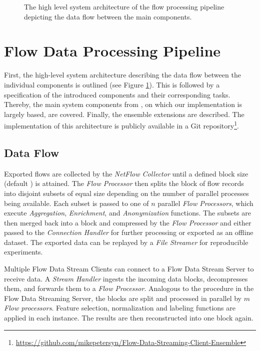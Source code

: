 \documentclass[conference]{IEEEtran}
\begin{document}
\begin{figure}[t]
\centering

\caption{The high level system architecture of the flow processing pipeline depicting the data flow between the main components.}
\label{fig:system_architecture}
\end{figure}

\newpage

\section{Flow Data Processing Pipeline}\label{sec:flow_data_processing_pipeline}
First, the high-level system architecture describing the data flow between the individual components is outlined (see Figure \ref{fig:system_architecture}). This is followed by a specification of the introduced components and their corresponding tasks. Thereby, the main system components from \cite{hardegen_flow-based_2019}, on which our implementation is largely based, are covered. Finally, the ensemble extensions are described. The implementation of this architecture is publicly available in a Git repository\footnote{\url{https://github.com/mikepetersyn/Flow-Data-Streaming-Client-Ensemble}}.


\subsection{Data Flow} \label{sec:data_flow}
Exported flows are collected by the \textit{NetFlow Collector} until a defined block size (default ) is attained. The \textit{Flow Processor} then splits the block of flow records into disjoint subsets of equal size depending on the number of parallel processes being available. Each subset is passed to one of $n$ parallel \textit{Flow Processors}, which execute \textit{Aggregation}, \textit{Enrichment}, and \textit{Anonymization} functions. The subsets are then merged back into a block and compressed by the \textit{Flow Processor} and either passed to the \textit{Connection Handler} for further processing or exported as an offline dataset. The exported data can be replayed by a \textit{File Streamer} for reproducible experiments.

Multiple Flow Data Stream Clients can connect to a Flow Data Stream Server to receive data. A \textit{Stream Handler} ingests the incoming data blocks, decompresses them, and forwards them to a \textit{Flow Processor}. Analogous to the procedure in the Flow Data Streaming Server, the blocks are split and processed in parallel by $m$ \textit{Flow processors}. Feature selection, normalization and labeling functions are applied in each instance. The results are then reconstructed into one block again.
\end{document}
